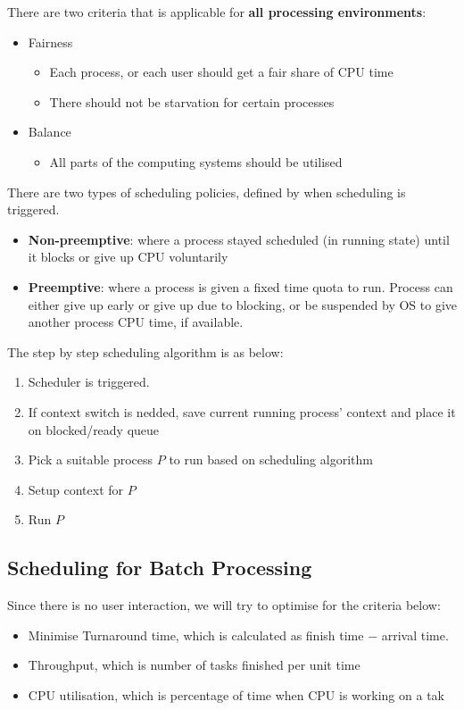 \documentclass[12pt]{article}
\theoremstyle{definition}
\begin{document}
There are two criteria that is applicable for \textbf{all processing environments}:
\begin{itemize}
  \item Fairness
  \begin{itemize}
    \item Each process, or each user should get a fair share of CPU time
    \item There should not be starvation for certain processes
  \end{itemize}
  \item Balance
  \begin{itemize}
    \item All parts of the computing systems should be utilised
  \end{itemize}
\end{itemize}
There are two types of scheduling policies, defined by when scheduling is triggered.
\begin{itemize}
  \item \textbf{Non-preemptive}: where a process stayed scheduled (in running state) until it blocks or give up CPU voluntarily
  \item \textbf{Preemptive}: where a process is given a fixed time quota to run. Process can either give up early or give up due to blocking, or be suspended by OS to give another process CPU time, if available.
\end{itemize}

The step by step scheduling algorithm is as below:
\begin{enumerate}
  \item Scheduler is triggered.
  \item If context switch is nedded, save current running process' context and place it on blocked/ready queue
  \item Pick a suitable process $P$ to run based on scheduling algorithm
  \item Setup context for $P$
  \item Run $P$
\end{enumerate}
\subsection{Scheduling for Batch Processing}
Since there is no user interaction, we will try to optimise for the criteria below:
\begin{itemize}
  \item Minimise Turnaround time, which is calculated as finish time $-$ arrival time.
  \item Throughput, which is number of tasks finished per unit time
  \item CPU utilisation, which is percentage of time when CPU is working on a tak
\end{itemize}
\end{document}
